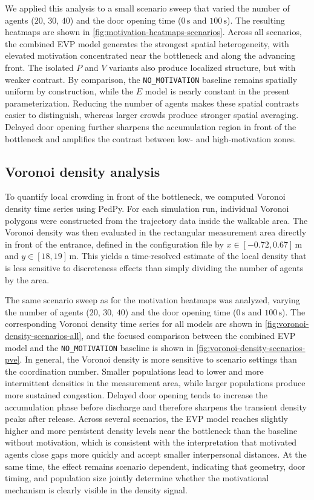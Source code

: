 \documentclass[pdflatex,sn-mathphys-num]{sn-jnl}%
\theoremstyle{thmstyleone}%
\theoremstyle{thmstyletwo}%
\theoremstyle{thmstylethree}%
\begin{document}
We applied this analysis to a small scenario sweep that varied the number of agents ($20$, $30$, $40$) and the door opening time ($0\,\mathrm{s}$ and $100\,\mathrm{s}$). The resulting heatmaps are shown in \cref{fig:motivation-heatmaps-scenarios}. Across all scenarios, the combined EVP model generates the strongest spatial heterogeneity, with elevated motivation concentrated near the bottleneck and along the advancing front. The isolated $P$ and $V$ variants also produce localized structure, but with weaker contrast. By comparison, the \texttt{NO\_MOTIVATION} baseline remains spatially uniform by construction, while the $E$ model is nearly constant in the present parameterization. Reducing the number of agents makes these spatial contrasts easier to distinguish, whereas larger crowds produce stronger spatial averaging. Delayed door opening further sharpens the accumulation region in front of the bottleneck and amplifies the contrast between low- and high-motivation zones.

\subsection{Voronoi density analysis}
To quantify local crowding in front of the bottleneck, we computed Voronoi density time series using PedPy. For each simulation run, individual Voronoi polygons were constructed from the trajectory data inside the walkable area. The Voronoi density was then evaluated in the rectangular measurement area directly in front of the entrance, defined in the configuration file by $x \in [-0.72, 0.67]\,\mathrm{m}$ and $y \in [18, 19]\,\mathrm{m}$. This yields a time-resolved estimate of the local density that is less sensitive to discreteness effects than simply dividing the number of agents by the area.

The same scenario sweep as for the motivation heatmaps was analyzed, varying the number of agents ($20$, $30$, $40$) and the door opening time ($0\,\mathrm{s}$ and $100\,\mathrm{s}$). The corresponding Voronoi density time series for all models are shown in \cref{fig:voronoi-density-scenarios-all}, and the focused comparison between the combined EVP model and the \texttt{NO\_MOTIVATION} baseline is shown in \cref{fig:voronoi-density-scenarios-pve}. In general, the Voronoi density is more sensitive to scenario settings than the coordination number. Smaller populations lead to lower and more intermittent densities in the measurement area, while larger populations produce more sustained congestion. Delayed door opening tends to increase the accumulation phase before discharge and therefore sharpens the transient density peaks after release. Across several scenarios, the EVP model reaches slightly higher and more persistent density levels near the bottleneck than the baseline without motivation, which is consistent with the interpretation that motivated agents close gaps more quickly and accept smaller interpersonal distances. At the same time, the effect remains scenario dependent, indicating that geometry, door timing, and population size jointly determine whether the motivational mechanism is clearly visible in the density signal.
\end{document}
